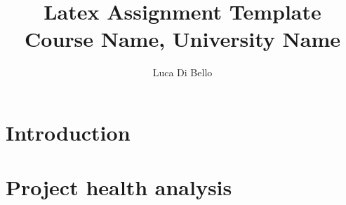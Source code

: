 \documentclass[a4paper, 11pt]{article}
\title{Latex Assignment Template\\\large Course Name, University Name}
\author{Luca Di Bello}
\date{\displaydate{today}}
\begin{document}
\maketitle

\section{Introduction}


\section{Project health analysis}


\nocite{*} %
\printbibliography
\end{document}
